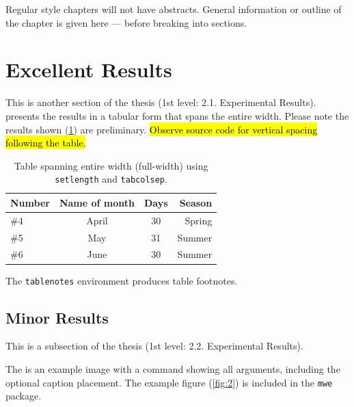 \documentclass[ms-thesis,mathdesign,12pt,showgrid]{ndsu-thesis-2022}
\begin{document}
Regular style chapters will not have abstracts. General information or outline of the chapter is given here --- before breaking into sections. 

\section{Excellent Results}
This is another section of the thesis (1st level: 2.1. Experimental Results). presents the results in a tabular form that spans the entire width. Please note the results shown (\cref{tab:2}) are preliminary. \hl{Observe source code for vertical spacing following the table.}

\begin{table}[ht]
\centering
\caption{Table spanning entire width (full-width) using \texttt{setlength} and
\texttt{tabcolsep}.}
\vo
\setlength{\tabcolsep}{3.75em}
\begin{tabular}{@{\hspace{2ex}} lccr @{\hspace{2ex}}}
\toprule
Number & Name of month & Days & Season\\
\midrule
\#4 	& April  & 30		& Spring\\
\#5 	& May    & 31		& Summer\\
\#6 	& June   & 30		& Summer\\
\bottomrule
\end{tabular}
\begin{tablenotes}[flushleft]
\item \hspace{-1ex}The \texttt{tablenotes} environment produces table footnotes. 
\end{tablenotes}
\label{tab:2}
\end{table}	

\vt%
\kant[7-8]

\subsection{Minor Results}
This is a subsection of the thesis (1st level: 2.2. Experimental Results). 	

\kant[8]
The  is an example image with a command showing all arguments, including the optional caption placement. The example figure (\cref{fig:2}) is included in the \texttt{mwe} package.
\end{document}
